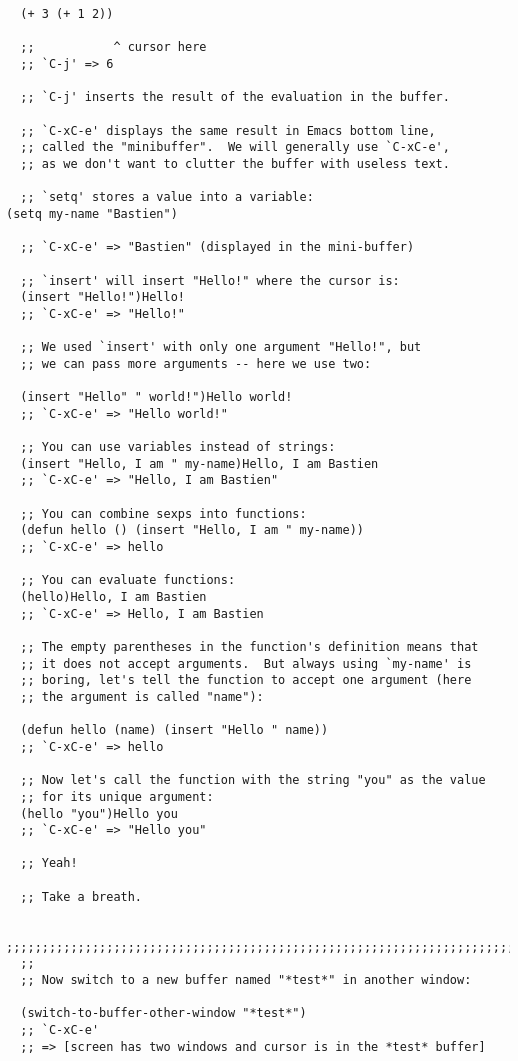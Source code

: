 \documentclass[11pt]{ctexart}
\begin{document}
{{{{\begin{lstlisting}
  (+ 3 (+ 1 2))

  ;;           ^ cursor here
  ;; `C-j' => 6

  ;; `C-j' inserts the result of the evaluation in the buffer.

  ;; `C-xC-e' displays the same result in Emacs bottom line,
  ;; called the "minibuffer".  We will generally use `C-xC-e',
  ;; as we don't want to clutter the buffer with useless text.

  ;; `setq' stores a value into a variable:
(setq my-name "Bastien")

  ;; `C-xC-e' => "Bastien" (displayed in the mini-buffer)

  ;; `insert' will insert "Hello!" where the cursor is:
  (insert "Hello!")Hello!
  ;; `C-xC-e' => "Hello!"

  ;; We used `insert' with only one argument "Hello!", but
  ;; we can pass more arguments -- here we use two:

  (insert "Hello" " world!")Hello world!
  ;; `C-xC-e' => "Hello world!"

  ;; You can use variables instead of strings:
  (insert "Hello, I am " my-name)Hello, I am Bastien
  ;; `C-xC-e' => "Hello, I am Bastien"

  ;; You can combine sexps into functions:
  (defun hello () (insert "Hello, I am " my-name))
  ;; `C-xC-e' => hello

  ;; You can evaluate functions:
  (hello)Hello, I am Bastien
  ;; `C-xC-e' => Hello, I am Bastien

  ;; The empty parentheses in the function's definition means that
  ;; it does not accept arguments.  But always using `my-name' is
  ;; boring, let's tell the function to accept one argument (here
  ;; the argument is called "name"):

  (defun hello (name) (insert "Hello " name))
  ;; `C-xC-e' => hello

  ;; Now let's call the function with the string "you" as the value
  ;; for its unique argument:
  (hello "you")Hello you
  ;; `C-xC-e' => "Hello you"

  ;; Yeah!

  ;; Take a breath.

  ;;;;;;;;;;;;;;;;;;;;;;;;;;;;;;;;;;;;;;;;;;;;;;;;;;;;;;;;;;;;;;;;;;;;;;;;
  ;;
  ;; Now switch to a new buffer named "*test*" in another window:

  (switch-to-buffer-other-window "*test*")
  ;; `C-xC-e'
  ;; => [screen has two windows and cursor is in the *test* buffer]


\end{lstlisting}}}}}
\end{document}
